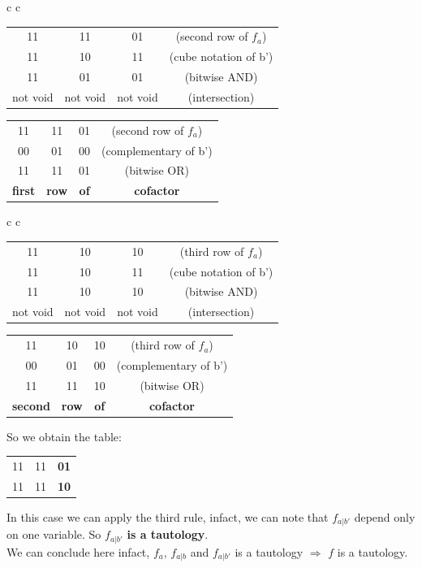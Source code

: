 \begin{center}
	\begin{tabular}{c c}
		\begin{tabular}{c c c c}
			11 & 11 & 01 & (second row of $f_{a}$) \\ 
			11 & 10 & 11 & (cube notation of b')\\ \hline 
			11 & 01 & 01 & (bitwise AND) \\ \hline
			not void & not void & not void & (intersection)
		\end{tabular}
		\quad\quad
		\begin{tabular}{c  c  c c}
			11 & 11 & 01 & (second row of $f_{a}$) \\ 
			00 & 01 & 00 & (complementary of b')\\ \hline 
			11 & 11 & 01 & (bitwise OR) \\ \hline
			\textbf{first} & \textbf{row} & \textbf{of} & \textbf{cofactor} \\
		\end{tabular}
	\end{tabular}
\end{center}

\begin{center}
	\begin{tabular}{c c}
		\begin{tabular}{c c c c}
			11 & 10 & 10 & (third row of $f_{a}$) \\ 
			11 & 10 & 11 & (cube notation of b')\\ \hline 
			11 & 10 & 10 & (bitwise AND) \\ \hline
			not void & not void & not void & (intersection)
		\end{tabular}
		\quad\quad
		\begin{tabular}{c  c  c c}
			11 & 10 & 10 & (third row of $f_{a}$) \\ 
			00 & 01 & 00 & (complementary of b')\\ \hline 
			11 & 11 & 10 & (bitwise OR) \\ \hline
			\textbf{second} & \textbf{row} & \textbf{of} & \textbf{cofactor} \\
		\end{tabular}
	\end{tabular}
\end{center}

So we obtain the table: 

\begin{center}
	\begin{tabular}{c c c}
		\hline
		11 & 11 & \textbf{01} \\ 
		11 & 11 & \textbf{10} \\ \hline 
		
	\end{tabular}
\end{center}

In this case we can apply the third rule, infact, we can note that $f_{a|b'}$ depend only on one variable. So $f_{a|b'}$ \textbf{is a tautology}.\\

We can conclude here infact, $f_{a}$, $f_{a|b}$ and $f_{a|b'}$ is a tautology $\Longrightarrow$ $f$ is a tautology.




